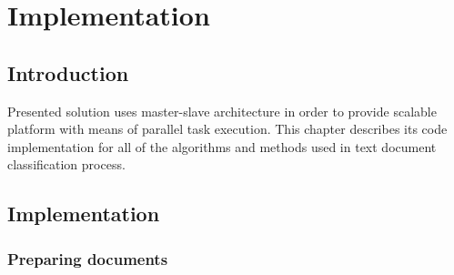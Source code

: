 \chapter{Implementation} \label{implementation}

\section{Introduction}
Presented solution uses master-slave architecture in order to provide scalable platform with means of parallel task execution. This chapter describes its code implementation for all of the algorithms and methods used in text document classification process.


\section{Implementation}

\subsection{Preparing documents}

